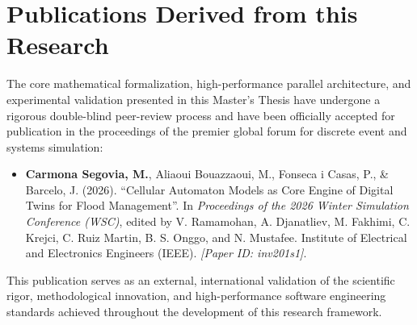 
\chapter*{Publications Derived from this Research}

The core mathematical formalization, high-performance parallel architecture, and experimental validation presented in this Master's Thesis 
have undergone a rigorous double-blind peer-review process and have been officially accepted for publication in the proceedings of the 
premier global forum for discrete event and systems simulation:

\vspace{0.5cm}

\begin{itemize}
    \item \textbf{Carmona Segovia, M.}, Aliaoui Bouazzaoui, M., Fonseca i Casas, P., \& Barcelo, J. (2026). ``Cellular Automaton Models as 
    Core Engine of Digital Twins for Flood Management''. In \textit{Proceedings of the 2026 Winter Simulation Conference (WSC)}, edited by 
    V. Ramamohan, A. Djanatliev, M. Fakhimi, C. Krejci, C. Ruiz Martin, B. S. Onggo, and N. Mustafee. Institute of Electrical and 
    Electronics Engineers (IEEE). \textit{[Paper ID: inv201s1]}.
\end{itemize}

\vspace{0.5cm}

\noindent This publication serves as an external, international validation of the scientific rigor, methodological innovation, and 
high-performance software engineering standards achieved throughout the development of this research framework.